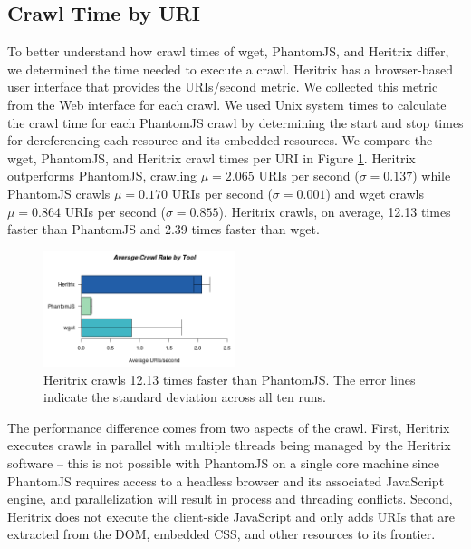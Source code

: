 \documentclass{sig-alternate}
\begin{document}

\subsection{Crawl Time by URI}
\label{clock}
To better understand how crawl times of wget, PhantomJS, and Heritrix differ, we determined the time needed to execute a crawl. Heritrix has a browser-based user interface that provides the URIs/second metric. We collected this metric from the Web interface for each crawl. We used Unix system times to calculate the crawl time for each PhantomJS crawl by determining the start and stop times for dereferencing each resource and its embedded resources. We compare the wget, PhantomJS, and Heritrix crawl times per URI in Figure \ref{crawlrate}. Heritrix outperforms PhantomJS, crawling $\mu=2.065$ URIs per second ($\sigma = 0.137$) while PhantomJS crawls $\mu=0.170$ URIs per second ($\sigma = 0.001$) and wget crawls $\mu=0.864$ URIs per second ($\sigma = 0.855$). Heritrix crawls, on average, 12.13 times faster than PhantomJS and 2.39 times faster than wget.

\begin{figure}
  \begin{center}
    	\includegraphics[width=0.5\textwidth,keepaspectratio]{./imgs/rateBarStats.png}
  \end{center}
  \caption{Heritrix crawls 12.13 times faster than PhantomJS. The error lines indicate the standard deviation across all ten runs.}
  \label{crawlrate}
\end{figure}

The performance difference comes from two aspects of the crawl. First, Heritrix executes crawls in parallel with multiple threads being managed by the Heritrix software -- this is not possible with PhantomJS on a single core machine since PhantomJS requires access to a headless browser and its associated JavaScript engine, and parallelization will result in process and threading conflicts. Second, Heritrix does not execute the client-side JavaScript and only adds URIs that are extracted from the DOM, embedded CSS, and other resources to its frontier. 
\end{document}
